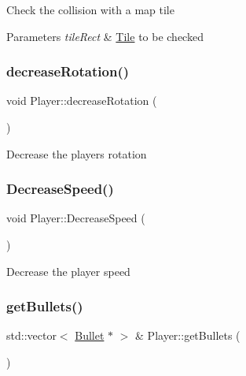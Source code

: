 Check the collision with a map tile 


\begin{DoxyParams}{Parameters}
{\em tile\+Rect} & \mbox{\hyperlink{class_tile}{Tile}} to be checked\\
\hline
\end{DoxyParams}
\mbox{\label{class_player_ad65092429c9fcb4d15f6af2591726b81}} 
\subsubsection{\texorpdfstring{decreaseRotation()}{decreaseRotation()}}
{\footnotesize\ttfamily void Player\+::decrease\+Rotation (\begin{DoxyParamCaption}{ }\end{DoxyParamCaption})}



Decrease the players rotation 

\mbox{\label{class_player_a0fc0bbed0ac5c2a0e25136b3e83faae6}} 
\subsubsection{\texorpdfstring{DecreaseSpeed()}{DecreaseSpeed()}}
{\footnotesize\ttfamily void Player\+::\+Decrease\+Speed (\begin{DoxyParamCaption}{ }\end{DoxyParamCaption})}



Decrease the player speed 

\mbox{\label{class_player_a4ad45c4c8298531f45ebed48ce001373}} 
\subsubsection{\texorpdfstring{getBullets()}{getBullets()}}
{\footnotesize\ttfamily std\+::vector$<$ \mbox{\hyperlink{class_bullet}{Bullet}} $\ast$ $>$ \& Player\+::get\+Bullets (\begin{DoxyParamCaption}{ }\end{DoxyParamCaption})}



